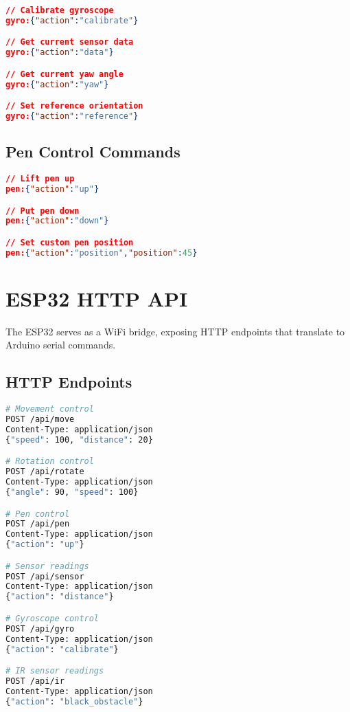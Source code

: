 \begin{lstlisting}[language=json,caption=Gyroscope Command Examples]
// Calibrate gyroscope
gyro:{"action":"calibrate"}

// Get current sensor data
gyro:{"action":"data"}

// Get current yaw angle
gyro:{"action":"yaw"}

// Set reference orientation
gyro:{"action":"reference"}
\end{lstlisting}

\subsection{Pen Control Commands}

\begin{lstlisting}[language=json,caption=Pen Control Examples]
// Lift pen up
pen:{"action":"up"}

// Put pen down
pen:{"action":"down"}

// Set custom pen position
pen:{"action":"position","position":45}
\end{lstlisting}

\section{ESP32 HTTP API}

The ESP32 serves as a WiFi bridge, exposing HTTP endpoints that translate to Arduino serial commands.

\subsection{HTTP Endpoints}

\begin{lstlisting}[language=bash,caption=HTTP API Endpoints]
# Movement control
POST /api/move
Content-Type: application/json
{"speed": 100, "distance": 20}

# Rotation control
POST /api/rotate
Content-Type: application/json
{"angle": 90, "speed": 100}

# Pen control
POST /api/pen
Content-Type: application/json
{"action": "up"}

# Sensor readings
POST /api/sensor
Content-Type: application/json
{"action": "distance"}

# Gyroscope control
POST /api/gyro
Content-Type: application/json
{"action": "calibrate"}

# IR sensor readings
POST /api/ir
Content-Type: application/json
{"action": "black_obstacle"}
\end{lstlisting}

